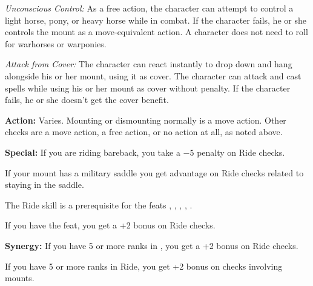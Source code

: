 \textit{Unconscious Control:} As a free action, the character can attempt to control a light horse, pony, or heavy horse while in combat. If the character fails, he or she controls the mount as a move-equivalent action. A character does not need to roll for warhorses or warponies.

\textit{Attack from Cover:} The character can react instantly to drop down and hang alongside his or her mount, using it as cover. The character can attack and cast spells while using his or her mount as cover without penalty. If the character fails, he or she doesn't get the cover benefit.

\textbf{Action:} Varies. Mounting or dismounting normally is a move action. Other checks are a move action, a free action, or no action at all, as noted above.

\textbf{Special:} If you are riding bareback, you take a $-5$ penalty on Ride checks.

If your mount has a military saddle you get advantage on Ride checks related to staying in the saddle.

The Ride skill is a prerequisite for the feats , , , , .

If you have the  feat, you get a +2 bonus on Ride checks.

\textbf{Synergy:} If you have 5 or more ranks in , you get a +2 bonus on Ride checks.

If you have 5 or more ranks in Ride, you get +2 bonus on  checks involving mounts.
